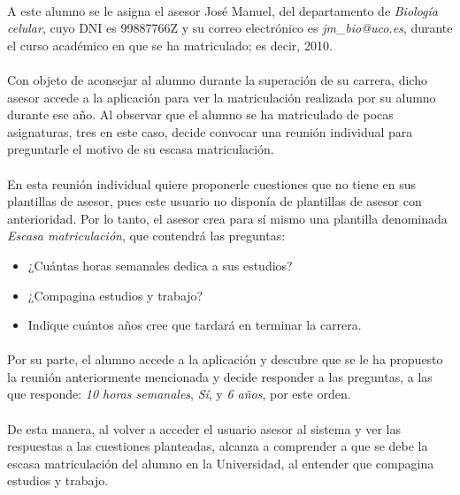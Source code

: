   \paragraph{}A este alumno se le asigna el asesor José Manuel, del departamento
  de \textit{Biología celular}, cuyo DNI es 99887766Z y su correo electrónico
  es \textit{jm\_bio@uco.es}, durante el curso académico en que se ha
  matriculado; es decir, 2010.

  \paragraph{}Con objeto de aconsejar al alumno durante la superación de su
  carrera, dicho asesor accede a la aplicación para ver la matriculación
  realizada por su alumno durante ese año. Al observar que el alumno se ha
  matriculado de pocas asignaturas, tres en este caso, decide convocar una
  reunión individual para preguntarle el motivo de su escasa matriculación.

  \paragraph{}En esta reunión individual quiere proponerle cuestiones que no
  tiene en sus plantillas de asesor, pues este usuario no disponía de plantillas
  de asesor con anterioridad. Por lo tanto, el asesor crea para sí mismo una
  plantilla denominada \textit{Escasa matriculación}, que contendrá las
  preguntas:

  \begin{itemize}
   \item ¿Cuántas horas semanales dedica a sus estudios?
   \item ¿Compagina estudios y trabajo?
   \item Indique cuántos años cree que tardará en terminar la carrera.
  \end{itemize}

  \paragraph{}Por su parte, el alumno accede a la aplicación y descubre que se
  le ha propuesto la reunión anteriormente mencionada y decide responder a las
  preguntas, a las que responde: \textit{10 horas semanales},
  \textit{Sí}, y \textit{6 años}, por este orden.

  \paragraph{}De esta manera, al volver a acceder el usuario asesor al sistema
  y ver las respuestas a las cuestiones planteadas, alcanza a comprender a que
  se debe la escasa matriculación del alumno en la Universidad, al entender que
  compagina estudios y trabajo.

